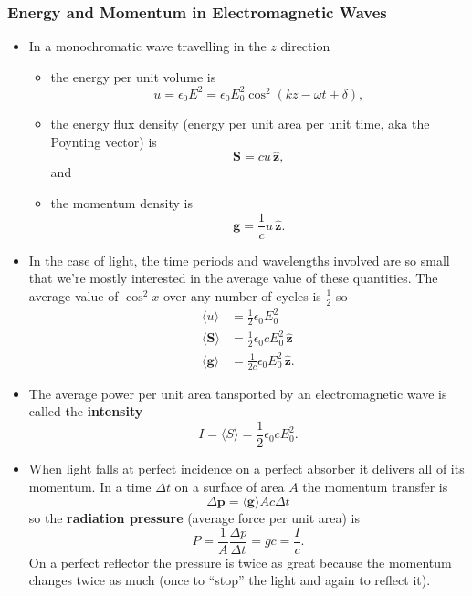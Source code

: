 \documentclass{article}
\renewcommand{\vec}[1]{\boldsymbol{\mathbf{#1}}}
\newcommand{\uvec}[1]{\hat{\vec{#1}}}
\begin{document}
\subsubsection{Energy and Momentum in Electromagnetic Waves}

\begin{itemize}
  \item In a monochromatic wave travelling in the $z$ direction

        \begin{itemize}
          \item the energy per unit volume is \[u = \epsilon_0 E^2 = \epsilon_0 E_0^2 \cos^2 (k z - \omega t + \delta),\]

          \item the energy flux density (energy per unit area per unit time, aka the Poynting vector) is \[\vec{S} = c u \,\uvec{z},\] and

          \item the momentum density is \[\vec{g} = \frac{1}{c} u \,\uvec{z}.\]
        \end{itemize}

  \item In the case of light, the time periods and wavelengths involved are so small that we're mostly interested in the average value of these quantities. The average value of $\cos^2 x$ over any number of cycles is $\frac{1}{2}$ so \begin{align*}
          \langle u \rangle       & = \frac{1}{2} \epsilon_0 E_0^2               \\
          \langle \vec{S} \rangle & = \frac{1}{2} \epsilon_0 c E_0^2 \,\uvec{z}  \\
          \langle \vec{g} \rangle & = \frac{1}{2 c} \epsilon_0 E_0^2 \,\uvec{z}.
        \end{align*}

  \item The average power per unit area tansported by an electromagnetic wave is called the \textbf{intensity} \[I = \langle S \rangle = \frac{1}{2} \epsilon_0 c E_0^2.\]

  \item When light falls at perfect incidence on a perfect absorber it delivers all of its momentum. In a time $\Delta t$ on a surface of area $A$ the momentum transfer is \[\Delta \vec{p} = \langle \vec{g} \rangle A c \Delta t\] so the \textbf{radiation pressure} (average force per unit area) is \[P = \frac{1}{A} \frac{\Delta p}{\Delta t} = g c = \frac{I}{c}.\] On a perfect reflector the pressure is twice as great because the momentum changes twice as much (once to ``stop'' the light and again to reflect it).
\end{itemize}
\end{document}
